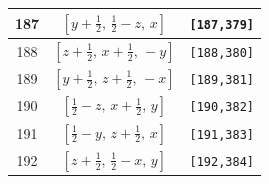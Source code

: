 \documentclass[fleqn,8pt]{jsarticle}
\begin{document}
\begin{longtable}{ccc}
187 & $\left[ y + \frac{1}{2},\, \frac{1}{2} - z,\, x \right]$ & {\tt [187,379]} \\ \hline
188 & $\left[ z + \frac{1}{2},\, x + \frac{1}{2},\, - y \right]$ & {\tt [188,380]} \\ \hline
189 & $\left[ y + \frac{1}{2},\, z + \frac{1}{2},\, - x \right]$ & {\tt [189,381]} \\ \hline
190 & $\left[ \frac{1}{2} - z,\, x + \frac{1}{2},\, y \right]$ & {\tt [190,382]} \\ \hline
191 & $\left[ \frac{1}{2} - y,\, z + \frac{1}{2},\, x \right]$ & {\tt [191,383]} \\ \hline
192 & $\left[ z + \frac{1}{2},\, \frac{1}{2} - x,\, y \right]$ & {\tt [192,384]} \\
\end{longtable}
\end{document}
